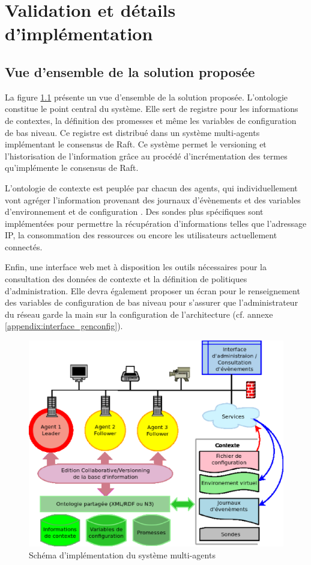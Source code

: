 \chapter{Validation et détails d'implémentation}

\section{Vue d'ensemble de la solution proposée}

La figure \ref{fig:archi} présente un vue d'ensemble de la solution proposée.
L'ontologie constitue le point central du système. Elle sert de registre pour
les informations de contextes, la définition des promesses et même les variables
de configuration de bas niveau.  Ce registre est distribué dans un système
multi-agents implémentant le consensus de Raft. Ce système permet le versioning
et l'historisation de l'information grâce au procédé d'incrémentation des termes
qu'implémente le consensus de Raft.

L'ontologie de contexte est peuplée par chacun des agents, qui individuellement
vont agréger l'information provenant des journaux d'évènements et des variables
d'environnement et de configuration . Des sondes plus spécifiques sont
implémentées pour permettre la récupération d'informations telles que
l'adressage IP, la consommation des ressources ou encore les utilisateurs
actuellement connectés. 

Enfin, une interface web met à disposition les outils nécessaires pour la
consultation des données de contexte et la définition de politiques
d'administration. Elle devra également proposer un écran pour le renseignement
des variables de configuration de bas niveau pour s'assurer que l'administrateur
du réseau garde la main sur la configuration de l'architecture (cf. annexe
\ref{appendix:interface_genconfig}).

\begin{figure}[H]
    \centering
    \includegraphics[width=.67\textwidth]{img/archi}
    \caption{Schéma d'implémentation du système multi-agents}
    \label{fig:archi}
\end{figure}


